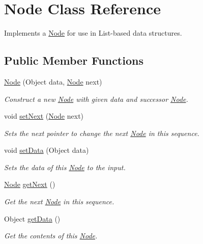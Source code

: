 \hypertarget{class_node}{
\section{Node Class Reference}
\label{class_node}
}
Implements a \hyperlink{class_node}{Node} for use in List-based data structures.  


\subsection*{Public Member Functions}
\begin{CompactItemize}
\item 
\hyperlink{class_node_2ccb948b5d0fc3a3192177a1fc635b04}{Node} (Object data, \hyperlink{class_node}{Node} next)
\begin{CompactList}\small\item\em Construct a new \hyperlink{class_node}{Node} with given data and successor \hyperlink{class_node}{Node}. \item\end{CompactList}\item 
void \hyperlink{class_node_7874ac94fe417848e4c558586e0dbb7a}{setNext} (\hyperlink{class_node}{Node} next)
\begin{CompactList}\small\item\em Sets the next pointer to change the next \hyperlink{class_node}{Node} in this sequence. \item\end{CompactList}\item 
void \hyperlink{class_node_809b0b9da2979c91cc4210cf6e90d528}{setData} (Object data)
\begin{CompactList}\small\item\em Sets the data of this \hyperlink{class_node}{Node} to the input. \item\end{CompactList}\item 
\hypertarget{class_node_20bff53e66300efb9a6c5df72e0ccad2}{
\hyperlink{class_node}{Node} \hyperlink{class_node_20bff53e66300efb9a6c5df72e0ccad2}{getNext} ()}
\label{class_node_20bff53e66300efb9a6c5df72e0ccad2}

\begin{CompactList}\small\item\em Get the next \hyperlink{class_node}{Node} in this sequence. \item\end{CompactList}\item 
\hypertarget{class_node_d1e5b90af16cb04513f5878131ba49ce}{
Object \hyperlink{class_node_d1e5b90af16cb04513f5878131ba49ce}{getData} ()}
\label{class_node_d1e5b90af16cb04513f5878131ba49ce}

\begin{CompactList}\small\item\em Get the contents of this \hyperlink{class_node}{Node}. \item\end{CompactList}\end{CompactItemize}


